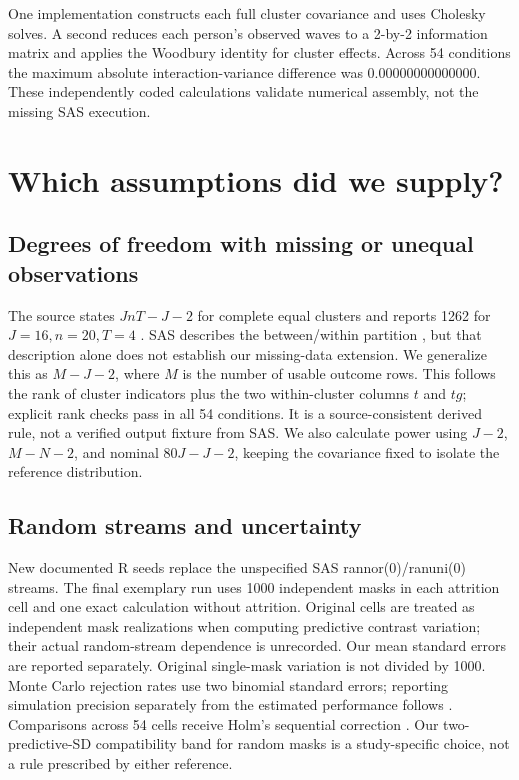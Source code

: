 \documentclass[11pt]{article}
\begin{document}
One implementation constructs each full cluster covariance and uses Cholesky solves. A second reduces each person's observed waves to a 2-by-2 information matrix and applies the Woodbury identity for cluster effects. Across 54 conditions the maximum absolute interaction-variance difference was 0.00000000000000. These independently coded calculations validate numerical assembly, not the missing SAS execution.
\section{Which assumptions did we supply?}
\subsection{Degrees of freedom with missing or unequal observations}
The source states $JnT-J-2$ for complete equal clusters and reports 1262 for $J=16, n=20, T=4$ \citep[Eq.~4.1, pp.~85--86]{kupzyk2011}. SAS describes the between/within partition \citep[MODEL statement, DDFM=BETWITHIN]{sasbw}, but that description alone does not establish our missing-data extension. We generalize this as $M-J-2$, where $M$ is the number of usable outcome rows. This follows the rank of cluster indicators plus the two within-cluster columns $t$ and $tg$; explicit rank checks pass in all 54 conditions. It is a source-consistent derived rule, not a verified output fixture from SAS. We also calculate power using $J-2$, $M-N-2$, and nominal $80J-J-2$, keeping the covariance fixed to isolate the reference distribution.
\subsection{Random streams and uncertainty}
New documented R seeds replace the unspecified SAS rannor(0)/ranuni(0) streams. The final exemplary run uses 1000 independent masks in each attrition cell and one exact calculation without attrition. Original cells are treated as independent mask realizations when computing predictive contrast variation; their actual random-stream dependence is unrecorded. Our mean standard errors are reported separately. Original single-mask variation is not divided by 1000. Monte Carlo rejection rates use two binomial standard errors; reporting simulation precision separately from the estimated performance follows \citet{morris2019}. Comparisons across 54 cells receive Holm's sequential correction \citep{holm1979}. Our two-predictive-SD compatibility band for random masks is a study-specific choice, not a rule prescribed by either reference.
\end{document}
